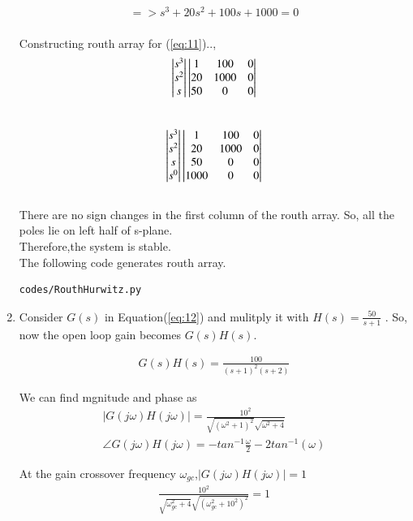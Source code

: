 \begin{enumerate}[label=\thesection.\arabic*.,ref=\thesection.\theenumi]
\begin{align}
=> s^{3}+20s^{2}+100s+1000=0   \label{eq:11} 
\end{align}
\\
Constructing routh array for (\ref{eq:11})..,
\begin{align}
\begin{vmatrix}s^3\\s^2\\s\end{vmatrix}
\begin{vmatrix}1 & 100 & 0 \\ 20 & 1000 & 0 \\ 50 & 0 & 0\end{vmatrix}
\end{align}\\

\begin{align}
\begin{vmatrix}s^3\\s^2\\s\\s^0\end{vmatrix}
\begin{vmatrix}1 & 100 & 0 \\ 20 & 1000 & 0 \\ 50 & 0 & 0 \\ 1000 & 0 & 0\end{vmatrix}
\end{align}\\

There are no sign changes in the first column of the routh array. So, all the poles lie on left half of s-plane. \\
Therefore,the system is stable.\\
The following code generates routh array.
\begin{lstlisting}
codes/RouthHurwitz.py
\end{lstlisting}

\item
Consider $G(s)$ in Equation(\ref{eq:12}) and mulitply it with $H(s)=\frac{50}{s+1}$ . So, now the open loop gain becomes $G(s)H(s)$.

\begin{align}
G(s)H(s)=\frac{100}{(s+1)^{2}(s+2)}
\label{eq:13} 
\end{align}

We can find mgnitude and phase as \\
\begin{align}
|G(j\omega)H(j\omega)|=\frac{10^{2}}{ \sqrt{(\omega^{2}+1)^{2}}
\sqrt{\omega^{2}+4}} \\
\angle G(j\omega)H(j\omega)=-tan^{-1}\frac{\omega}{2}-2tan^{-1}(\omega) \label{eq:14} 
\end{align}

At the gain crossover frequency $\omega_{gc}$,$|G(j\omega)H(j\omega)|=1$
\\
\begin{align}
\frac{10^{2}}{\sqrt{\omega_{gc}^{2}+4} \sqrt{(\omega_{gc}^{2}+10^{2})^{2}}}=1 \\
\end{align}


\end{enumerate}
